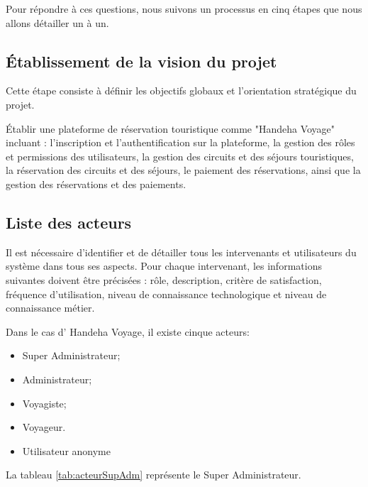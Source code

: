 \documentclass[12pt]{report}
\begin{document}
				Pour répondre à ces questions, nous suivons un processus en cinq étapes que nous allons détailler un à un.

				\subsection{Établissement de la vision du projet}

				\hspace{15pt} Cette étape consiste à définir les objectifs globaux et l'orientation stratégique du projet.

				Établir une plateforme de réservation touristique comme "Handeha Voyage" incluant : l'inscription et l'authentification sur la plateforme, la gestion des rôles et permissions des utilisateurs, la gestion des circuits et des séjours touristiques, la réservation des circuits et des séjours, le paiement des réservations, ainsi que la gestion des réservations et des paiements.

				\subsection{Liste des acteurs}

				\hspace{15pt} Il est nécessaire d'identifier et de détailler tous les intervenants et utilisateurs du système dans tous ses aspects. Pour chaque intervenant, les informations suivantes doivent être précisées : rôle, description, critère de satisfaction, fréquence d’utilisation, niveau de connaissance technologique et niveau de connaissance métier.

				Dans le cas d' Handeha Voyage, il existe cinque acteurs:

				\begin{itemize}
					\item Super Administrateur;
					\item Administrateur;
					\item Voyagiste;
					\item Voyageur.
					\item Utilisateur anonyme
				\end{itemize}

				La tableau \ref{tab:acteurSupAdm} représente le Super Administrateur.
\end{document}
